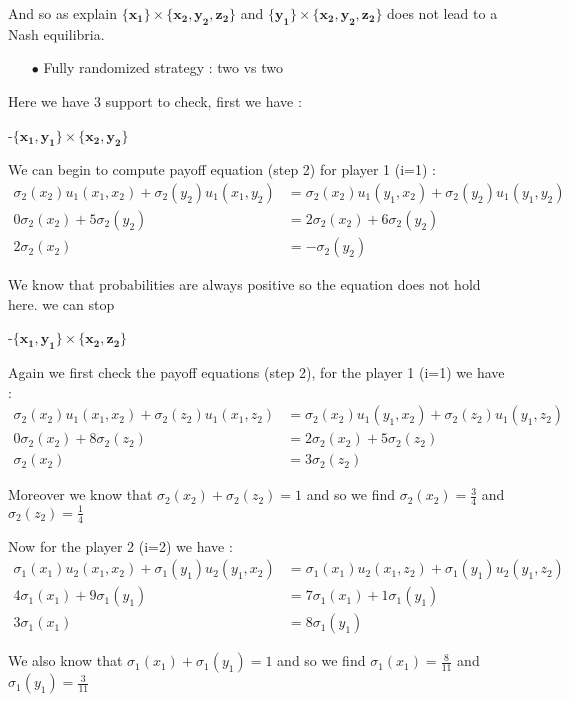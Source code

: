 And so as explain $\mathbf{\{x_1\}}\times\mathbf{\{x_2,y_2,z_2\}}$ and $\mathbf{\{y_1\}}\times\mathbf{\{x_2,y_2,z_2\}}$ does not lead to a Nash equilibria.


\begin{itemize}
  \item[$\bullet$] Fully randomized strategy : two vs two
\end{itemize}

Here we have 3 support to check, first we have :

-$\mathbf{\{x_1,y_1\}}\times\mathbf{\{x_2,y_2\}}$

 We can begin to compute payoff equation (step 2) for player 1 (i=1) :
 \begin{align*}
 \sigma_2(x_2)u_1(x_1,x_2) + \sigma_2(y_2)u_1(x_1,y_2) &= \sigma_2(x_2)u_1(y_1,x_2) + \sigma_2(y_2)u_1(y_1,y_2) \\
 0\sigma_2(x_2)+5\sigma_2(y_2)&= 2\sigma_2(x_2) + 6\sigma_2(y_2) \\
 2\sigma_2(x_2)&=-\sigma_2(y_2)
\end{align*}

We know that  probabilities are  always positive so the equation does not hold here. we can stop


-$\mathbf{\{x_1,y_1\}}\times\mathbf{\{x_2,z_2\}}$

Again we first check the payoff equations (step 2), for the player 1 (i=1) we have : 
\begin{align*}
 \sigma_2(x_2)u_1(x_1,x_2) + \sigma_2(z_2)u_1(x_1,z_2) &= \sigma_2(x_2)u_1(y_1,x_2) + \sigma_2(z_2)u_1(y_1,z_2) \\
 0\sigma_2(x_2)+8\sigma_2(z_2)&= 2\sigma_2(x_2) + 5\sigma_2(z_2) \\
 \sigma_2(x_2)&=3\sigma_2(z_2)
\end{align*}

Moreover we know that $\sigma_2(x_2) + \sigma_2(z_2) = 1$ and so we find $\sigma_2(x_2)=\frac{3}{4}$ and $\sigma_2(z_2)=\frac{1}{4}$

Now for the player 2 (i=2) we have : 
\begin{align*}
 \sigma_1(x_1)u_2(x_1,x_2) + \sigma_1(y_1)u_2(y_1,x_2) &= \sigma_1(x_1)u_2(x_1,z_2) + \sigma_1(y_1)u_2(y_1,z_2) \\
 4\sigma_1(x_1)+9\sigma_1(y_1)&= 7\sigma_1(x_1) + 1\sigma_1(y_1) \\
 3\sigma_1(x_1)&=8\sigma_1(y_1)
\end{align*}

We also know that $\sigma_1(x_1) + \sigma_1(y_1) = 1$ and so we find $\sigma_1(x_1)=\frac{8}{11}$ and $\sigma_1(y_1)=\frac{3}{11}$

